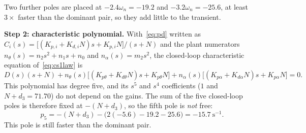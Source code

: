 \documentclass[11pt,a4paper]{article}
\begin{document}
Two further poles are placed at $-2.4\omega_n=-19.2$ and
$-3.2\omega_n=-25.6$, at least $3\times$ faster than the dominant pair, so
they add little to the transient.

\textbf{Step 2: characteristic polynomial.} With~\eqref{eq:pd} written as
$C_i(s)=\big[(K_{p,i}+K_{d,i}N)s+K_{p,i}N\big]/(s+N)$ and the plant
numerators $n_\theta(s)=n_2s^2+n_1s+n_0$ and $n_\alpha(s)=m_2s^2$, the
closed-loop characteristic equation of~\eqref{eq:cs1law} is
\begin{equation}\label{eq:char}
D(s)(s+N)+n_\theta(s)\big[(K_{p\theta}+K_{d\theta}N)s+K_{p\theta}N\big]
+n_\alpha(s)\big[(K_{p\alpha}+K_{d\alpha}N)s+K_{p\alpha}N\big]=0.
\end{equation}
This polynomial has degree five, and its $s^5$ and $s^4$ coefficients
($1$ and $N+d_3=71.70$) do not depend on the gains. The sum of the five
closed-loop poles is therefore fixed at $-(N+d_3)$, so the fifth pole is
\emph{not} free:
\begin{equation}
p_5=-(N+d_3)-\big(2(-5.6)-19.2-25.6\big)=-15.7~\mathrm s^{-1}.
\end{equation}
This pole is still faster than the dominant pair.
\end{document}
